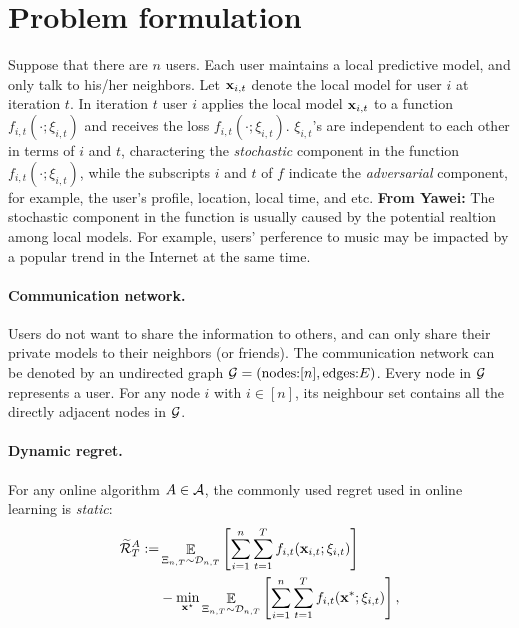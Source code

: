\documentclass{article}
\def\rc{\color {red}}
\begin{document}
\section{Problem formulation}

Suppose that there are $n$ users. Each user maintains a local predictive model, and only talk to his/her neighbors. Let ${\bf x}_{i, t}$ denote the local model for user $i$ at iteration $t$. In iteration $t$ user $i$ applies the local model ${\bf x}_{i,t}$ to a function $f_{i,t}(\cdot; \xi_{i,t})$ and receives the loss $f_{i,t}(\cdot; \xi_{i,t})$. $\xi_{i,t}$'s are independent to each other in terms of $i$ and $t$, charactering the \emph{stochastic} component in the function $f_{i,t}(\cdot; \xi_{i,t})$, while the subscripts $i$ and $t$ of $f$ indicate the \emph{adversarial} component, for example, the user's profile, location, local time, and etc. {\rc \textbf{From Yawei:} The stochastic component in the function is usually caused by the potential realtion among local models. For example, users' perference to music may be impacted by a popular trend in the Internet at the same time. } 






\paragraph{Communication network.} Users do not want to share the information to others, and can only share their private models to their neighbors (or friends). The communication network can be denoted by an undirected graph ${\mathcal{G}}=(\text{nodes:} [n], \text{edges:} E)$. Every node in ${\mathcal{G}}$ represents a user. For any node $i$ with $i\in[n]$, its neighbour set contains all the directly adjacent nodes in ${\mathcal{G}}$. 

\paragraph{Dynamic regret.} For any online algorithm $A\in{\mathcal{A}}$, the commonly used regret used in online learning is \emph{static}:
\begin{align}
\nonumber
 \widetilde{{\mathcal{R}}}_T^{A} := & \mathop{\mathbb{E}}_{ \Xi_{n,T} \sim \mathcal{D}_{n,T} }  \left[\sum_{i=1}^n\sum_{t=1}^T f_{i,t}({\bf x}_{i,t};\xi_{i,t}) \right]
\\ \label{equa_definition_our_regret}
& - \min_{{\bf x}^\star} \mathop{\mathbb{E}}_{ \Xi_{n,T} \sim \mathcal{D}_{n,T} }\left[\sum_{i=1}^n\sum_{t=1}^T f_{i,t}({\bf x}^\ast;\xi_{i,t}) \right],
\end{align}
\end{document}
